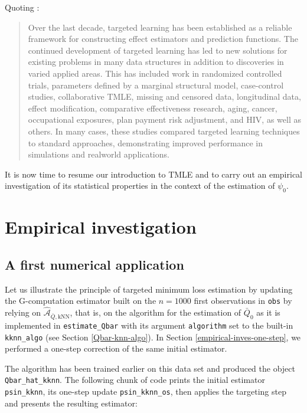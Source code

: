 \documentclass[11pt,openright,twoside]{book}
\newcommand{\Algo}{\widehat{\mathcal{A}}}
\newcommand{\Qbar}{\bar{Q}}
\theoremstyle{definition}
\theoremstyle{definition}
\theoremstyle{definition}
\theoremstyle{remark}
\begin{document}
Quoting \citep{TMLEbook18}:

\begin{quote}
Over the last decade, targeted learning has been established as a reliable framework for constructing effect estimators and prediction functions. The continued development of targeted learning has led to new solutions for existing problems in many data structures in addition to discoveries in varied applied areas. This has included work in randomized controlled trials, parameters defined by a marginal structural model, case-control studies, collaborative TMLE, missing and censored data, longitudinal data, effect modification, comparative effectiveness research, aging, cancer, occupational exposures, plan payment risk adjustment, and HIV, as well as others. In many cases, these studies compared targeted learning techniques to standard approaches, demonstrating improved performance in simulations and realworld applications.
\end{quote}

It is now time to resume our introduction to TMLE and to carry out an
empirical investigation of its statistical properties in the context of the
estimation of \(\psi_{0}\).

\hypertarget{empirical-inves-tmle}{%
\section{Empirical investigation}\label{empirical-inves-tmle}}

\hypertarget{empirical-inves-tmle-first}{%
\subsection{A first numerical application}\label{empirical-inves-tmle-first}}

Let us illustrate the principle of targeted minimum loss estimation by
updating the G-computation estimator built on the \(n=1000\) first observations
in \texttt{obs} by relying on \(\Algo_{\Qbar,\text{kNN}}\), that is, on the algorithm
for the estimation of \(\Qbar_{0}\) as it is implemented in \texttt{estimate\_Qbar} with
its argument \texttt{algorithm} set to the built-in \texttt{kknn\_algo} (see Section
\ref{Qbar-knn-algo}). In Section \ref{empirical-inves-one-step}, we
performed a one-step correction of the same initial estimator.

The algorithm has been trained earlier on this data set and produced the
object \texttt{Qbar\_hat\_kknn}. The following chunk of code prints the initial
estimator \texttt{psin\_kknn}, its one-step update \texttt{psin\_kknn\_os}, then applies the
targeting step and presents the resulting estimator:
\end{document}
